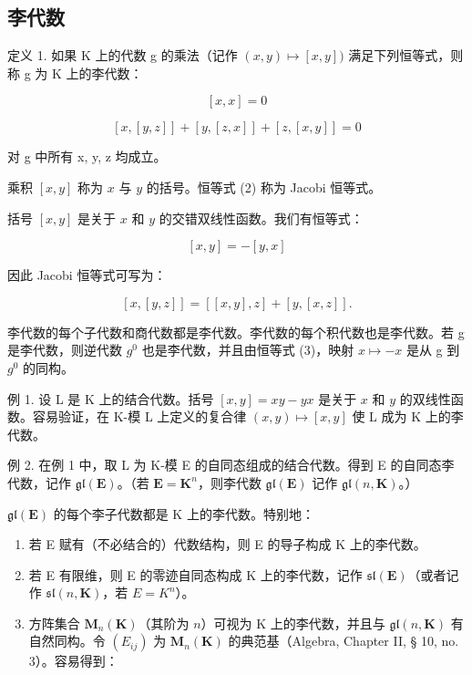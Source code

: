 \subsection{李代数}

定义 1. 如果 K 上的代数 g 的乘法（记作 \((x,y)\mapsto [x,y])\) 满足下列恒等式，则称 g 为 K 上的李代数：

\[
[ x, x ] = 0\tag{1}
\]

\[
[ x, [ y, z ] ] + [ y, [ z, x ] ] + [ z, [ x, y ] ] = 0\tag{2}
\]

对 g 中所有 x, y, z 均成立。

乘积 \([x, y]\) 称为 \(x\) 与 \(y\) 的括号。恒等式 (2) 称为 Jacobi 恒等式。

括号 \([x, y]\) 是关于 \(x\) 和 \(y\) 的交错双线性函数。我们有恒等式：

\[
[ x, y ] = - [ y, x ]\tag{3}
\]

因此 Jacobi 恒等式可写为：

\[
[ x, [ y, z ] ] = [ [ x, y ], z ] + [ y, [ x, z ] ].\tag{4}
\]

李代数的每个子代数和商代数都是李代数。李代数的每个积代数也是李代数。若 g 是李代数，则逆代数 \(g^{0}\) 也是李代数，并且由恒等式 (3)，映射 \(x \mapsto -x\) 是从 g 到 \(g^{0}\) 的同构。

例 1. 设 L 是 K 上的结合代数。括号 \([x, y] = xy - yx\) 是关于 \(x\) 和 \(y\) 的双线性函数。容易验证，在 K-模 L 上定义的复合律 \((x, y) \mapsto [x, y]\) 使 L 成为 K 上的李代数。

例 2. 在例 1 中，取 L 为 K-模 E 的自同态组成的结合代数。得到 E 的自同态李代数，记作 \(\mathfrak{gl}(\mathbf{E})\)。（若 \(\mathbf{E} = \mathbf{K}^n\)，则李代数 \(\mathfrak{gl}(\mathbf{E})\) 记作 \(\mathfrak{gl}(n, \mathbf{K})\)。）

\(\mathfrak{gl}(\mathbf{E})\) 的每个李子代数都是 K 上的李代数。特别地：

\begin{enumerate}
\def\labelenumi{(\arabic{enumi})}
\item
  若 E 赋有（不必结合的）代数结构，则 E 的导子构成 K 上的李代数。
\item
  若 E 有限维，则 E 的零迹自同态构成 K 上的李代数，记作 \(\mathfrak{sl}(\mathbf{E})\)（或者记作 \(\mathfrak{sl}(n,\mathbf{K})\)，若 \(E = K^{n}\)）。
\item
  方阵集合 \(\mathbf{M}_n(\mathbf{K})\)（其阶为 \(n\)）可视为 K 上的李代数，并且与 \(\mathfrak{gl}(n, \mathbf{K})\) 有自然同构。令 \((E_{ij})\) 为 \(\mathbf{M}_n(\mathbf{K})\) 的典范基（Algebra, Chapter II, § 10, no. 3）。容易得到：
\end{enumerate}

